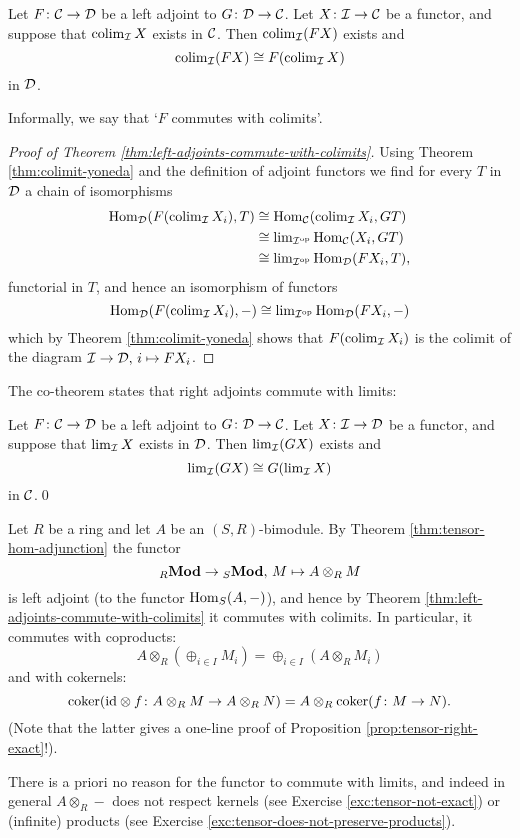 \begin{theorem}\label{thm:left-adjoints-commute-with-colimits}
Let $F\colon {\mathcal{C}}\to {\mathcal{D}}$ be a left adjoint to $G\colon {\mathcal{D}}\to {\mathcal{C}}$. Let $X\colon {\mathcal{I}} \to {\mathcal{C}}$ be a functor, and suppose that $\operatorname{colim}_{\mathcal{I}} X$ exists in ${\mathcal{C}}$. Then $\operatorname{colim}_{\mathcal{I}} (FX)$ exists and
\[
	\operatorname{colim}_{\mathcal{I}} (FX) \cong F(\operatorname{colim}_{\mathcal{I}} X)
\]
in ${\mathcal{D}}$.
\end{theorem}

Informally, we say that `$F$ commutes with colimits'.

\begin{proof}[Proof of Theorem \ref{thm:left-adjoints-commute-with-colimits}]
Using Theorem \ref{thm:colimit-yoneda} and the definition of adjoint functors we find for every $T$ in ${\mathcal{D}}$ a chain of isomorphisms
\begin{align*}
	\operatorname{Hom}_{\mathcal{D}}(F(\operatorname{colim}_{\mathcal{I}} X_i), T)
		&\cong \operatorname{Hom}_{\mathcal{C}}( \operatorname{colim}_{\mathcal{I}} X_i , GT ) \\
		&\cong \textstyle\lim_{{\mathcal{I}}^{\mathrm{op}}} \operatorname{Hom}_{\mathcal{C}}( X_i, GT) \\
		&\cong \textstyle\lim_{{\mathcal{I}}^{\mathrm{op}}} \operatorname{Hom}_{\mathcal{D}}( FX_i, T),
\end{align*}
functorial in $T$,  and hence an isomorphism of functors
\[
	\operatorname{Hom}_{\mathcal{D}}(F(\operatorname{colim}_{\mathcal{I}} X_i), - ) \cong 
	 \textstyle\lim_{{\mathcal{I}}^{\mathrm{op}}} \operatorname{Hom}_{\mathcal{D}}( FX_i, -)
\]
which by Theorem \ref{thm:colimit-yoneda} shows that $F(\operatorname{colim}_{\mathcal{I}} X_i)$ is the colimit of the
diagram ${\mathcal{I}} \to {\mathcal{D}},\, i \mapsto FX_i$.
\end{proof}

The co-theorem states that right adjoints commute with limits:

\begin{theorem}\label{thm:right-adjoints-commute-with-limits}
Let $F\colon {\mathcal{C}}\to {\mathcal{D}}$ be a left adjoint to $G\colon {\mathcal{D}}\to {\mathcal{C}}$. Let $X\colon {\mathcal{I}} \to {\mathcal{D}}$ be a functor, and suppose that $\lim_{\mathcal{I}} X$ exists in ${\mathcal{D}}$. Then $\lim_{\mathcal{I}} (GX)$ exists and
\[
	\textstyle\lim_{\mathcal{I}} (GX) \cong G(\textstyle\lim_{\mathcal{I}} X)
\]
in ${\mathcal{C}}$.\qed
\end{theorem}




\begin{example}
Let $R$ be a ring and let $A$ be an $(S,R)$-bimodule.
By Theorem \ref{thm:tensor-hom-adjunction} the functor
\[
	{}_R\mathbf{Mod} \to {}_S\mathbf{Mod},\, M \mapsto A \otimes_R M
\]
is left adjoint (to the functor $\operatorname{Hom}_S(A,-)$), and hence by Theorem \ref{thm:left-adjoints-commute-with-colimits} it commutes with 
colimits. In particular, it commutes with coproducts:
\[
	A\otimes_R (\oplus_{i\in I} M_i) = \oplus_{i\in I} ( A\otimes_R M_i )
\]
and with cokernels:
\[
	\operatorname{coker}( {\rm id}\otimes f\colon A\otimes_R M \to A\otimes_R N ) =
	A\otimes_R \operatorname{coker}(f\colon M \to N).
\]
(Note that the latter gives a one-line proof of Proposition \ref{prop:tensor-right-exact}!). 

There is a priori no reason for the functor to commute with limits, and indeed in general $A\otimes_R -$ does not respect kernels (see Exercise \ref{exc:tensor-not-exact}) or (infinite) products (see Exercise \ref{exc:tensor-does-not-preserve-products}).
\end{example}

